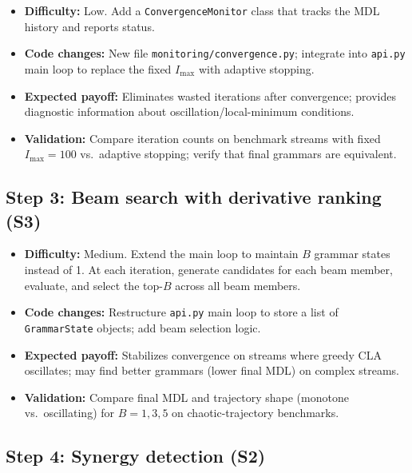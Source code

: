\documentclass[11pt]{article}
\begin{document}
\begin{itemize}
  \item \textbf{Difficulty:} Low.  Add a \texttt{ConvergenceMonitor} class that tracks the MDL history and reports status.
  \item \textbf{Code changes:} New file \texttt{monitoring/convergence.py}; integrate into \texttt{api.py} main loop to replace the fixed $I_{\max}$ with adaptive stopping.
  \item \textbf{Expected payoff:} Eliminates wasted iterations after convergence; provides diagnostic information about oscillation/local-minimum conditions.
  \item \textbf{Validation:} Compare iteration counts on benchmark streams with fixed $I_{\max} = 100$ vs.\ adaptive stopping; verify that final grammars are equivalent.
\end{itemize}

\subsection{Step 3: Beam search with derivative ranking (S3)}

\begin{itemize}
  \item \textbf{Difficulty:} Medium.  Extend the main loop to maintain $B$ grammar states instead of 1.  At each iteration, generate candidates for each beam member, evaluate, and select the top-$B$ across all beam members.
  \item \textbf{Code changes:} Restructure \texttt{api.py} main loop to store a list of \texttt{GrammarState} objects; add beam selection logic.
  \item \textbf{Expected payoff:} Stabilizes convergence on streams where greedy CLA oscillates; may find better grammars (lower final MDL) on complex streams.
  \item \textbf{Validation:} Compare final MDL and trajectory shape (monotone vs.\ oscillating) for $B = 1, 3, 5$ on chaotic-trajectory benchmarks.
\end{itemize}

\subsection{Step 4: Synergy detection (S2)}
\end{document}
